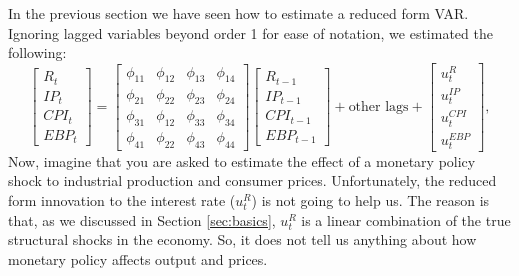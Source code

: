 \documentclass[10pt]{article}
\begin{document}
In the previous section we have seen how to estimate a reduced form VAR.
Ignoring lagged variables beyond order 1 for ease of notation, we estimated
the following:%
\begin{equation}
\begin{bmatrix}
R_{t} \\ 
IP_{t} \\ 
CPI_{t} \\ 
EBP_{t}%
\end{bmatrix}%
=\left[ 
\begin{array}{cccc}
\phi _{11} & \phi _{12} & \phi _{13} & \phi _{14} \\ 
\phi _{21} & \phi _{22} & \phi _{23} & \phi _{24} \\ 
\phi _{31} & \phi _{12} & \phi _{33} & \phi _{34} \\ 
\phi _{41} & \phi _{22} & \phi _{43} & \phi _{44}%
\end{array}%
\right] 
\begin{bmatrix}
R_{t-1} \\ 
IP_{t-1} \\ 
CPI_{t-1} \\ 
EBP_{t-1}%
\end{bmatrix}%
+\text{other lags}+%
\begin{bmatrix}
u_{t}^{R} \\ 
u_{t}^{IP} \\ 
u_{t}^{CPI} \\ 
u_{t}^{EBP}%
\end{bmatrix}%
,
\end{equation}%
Now, imagine that you are asked to estimate the effect of a monetary policy
shock to industrial production and consumer prices. Unfortunately, the
reduced form innovation to the interest rate ($u_{t}^{R}$) is not going to
help us. The reason is that, as we discussed in Section \ref{sec:basics}, $%
u_{t}^{R}$ is a linear combination of the true structural shocks in the
economy. So, it does not tell us anything about how monetary policy affects
output and prices.
\end{document}
